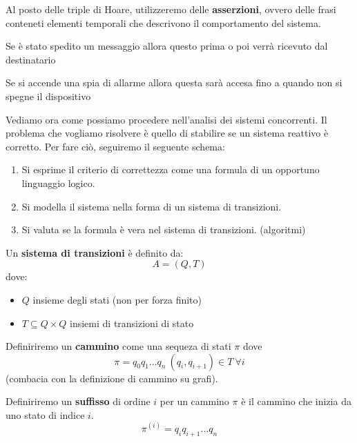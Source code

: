 Al posto delle triple di Hoare, utilizzeremo delle \textbf{asserzioni}, ovvero
delle frasi conteneti elementi temporali che descrivono il comportamento del sistema.
\begin{esempio}
    Se è stato spedito un messaggio allora questo prima o poi verrà ricevuto dal
    destinatario
\end{esempio}
\begin{esempio}
    Se si accende una spia di allarme allora questa sarà accesa fino a quando non
    si spegne il dispositivo
\end{esempio}
Vediamo ora come possiamo procedere nell'analisi dei sistemi concorrenti. Il
problema che vogliamo risolvere è quello di stabilire se un sistema reattivo è
corretto. Per fare ciò, seguiremo il seguente schema:
\begin{enumerate}
    \item Si esprime il criterio di correttezza come una formula di un opportuno
          linguaggio logico.
    \item Si modella il sistema nella forma di un sistema di transizioni.
    \item Si valuta se la formula è vera nel sistema di transizioni. (algoritmi)
\end{enumerate}
\begin{definizione}
    Un \textbf{sistema di transizioni} è definito da:
    \begin{equation}
        A=(Q,T)
    \end{equation}
    dove:
    \begin{itemize}
        \item $Q$ insieme degli stati (non per forza finito)
        \item $T\subseteq Q\times Q$ insiemi di transizioni di stato
    \end{itemize}
\end{definizione}
\begin{definizione}
    Definiriremo un \textbf{cammino} come una sequeza di stati $\pi$ dove
    \begin{equation}
        \pi = q_0q_1\dots q_n \ (q_i,q_{i+1})\in T \ \forall i
    \end{equation}
    (combacia con la definizione di cammino su grafi).
\end{definizione}
\begin{definizione}
    Definiriremo un \textbf{suffisso} di ordine $i$ per un cammino $\pi$ è il
    cammino che inizia da uno stato di indice $i$.
    \begin{equation}
        \pi^{(i)} = q_iq_{i+1}\dots q_n
    \end{equation}
\end{definizione}
